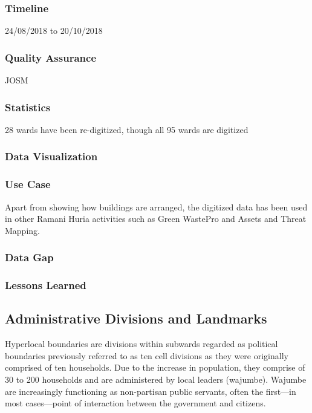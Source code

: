 \documentclass[a4paper,12pt,twoside]{article}
\begin{document}
\subsubsection{Timeline}
24/08/2018 to 20/10/2018

\subsubsection{Quality Assurance}
JOSM

\subsubsection{Statistics}
28 wards have been re-digitized, though all 95 wards are digitized

\subsubsection{Data Visualization}

\subsubsection{Use Case}
Apart from showing how buildings are arranged, the digitized data has been used in other Ramani Huria activities such as Green WastePro and Assets and Threat Mapping.

\subsubsection{Data Gap}

\subsubsection{Lessons Learned}

\newpage
\subsection{Administrative Divisions and Landmarks}
Hyperlocal boundaries are divisions within subwards regarded as political boundaries previously referred to as ten cell divisions as they were originally comprised of ten households.
Due to the increase in population, they comprise of 30 to 200 households and are administered by local leaders (wajumbe). Wajumbe are increasingly functioning as non-partisan public servants, often the first---in most cases---point of interaction between the government and citizens.
\end{document}
